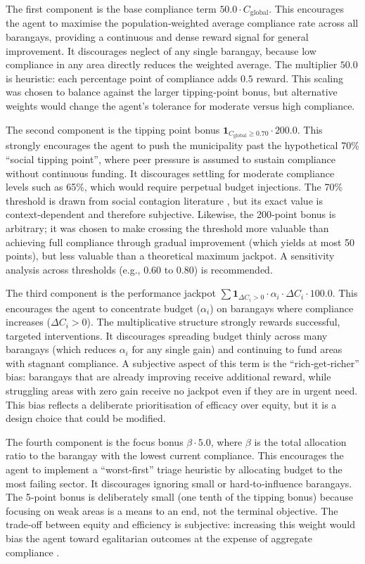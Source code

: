 The first component is the base compliance term \(50.0 \cdot C_{\text{global}}\). This encourages the agent to maximise the population‑weighted average compliance rate across all barangays, providing a continuous and dense reward signal for general improvement. It discourages neglect of any single barangay, because low compliance in any area directly reduces the weighted average. The multiplier \(50.0\) is heuristic: each percentage point of compliance adds \(0.5\) reward. This scaling was chosen to balance against the larger tipping‑point bonus, but alternative weights would change the agent’s tolerance for moderate versus high compliance.

The second component is the tipping point bonus \(\mathbf{1}_{C_{\text{global}} \ge 0.70} \cdot 200.0\). This strongly encourages the agent to push the municipality past the hypothetical 70\% “social tipping point”, where peer pressure is assumed to sustain compliance without continuous funding. It discourages settling for moderate compliance levels such as 65\%, which would require perpetual budget injections. The 70\% threshold is drawn from social contagion literature \citep{Centola2018}, but its exact value is context‑dependent and therefore subjective. Likewise, the 200‑point bonus is arbitrary; it was chosen to make crossing the threshold more valuable than achieving full compliance through gradual improvement (which yields at most 50 points), but less valuable than a theoretical maximum jackpot. A sensitivity analysis across thresholds (e.g., 0.60 to 0.80) is recommended.

The third component is the performance jackpot \(\sum \mathbf{1}_{\Delta C_i > 0} \cdot \alpha_i \cdot \Delta C_i \cdot 100.0\). This encourages the agent to concentrate budget (\(\alpha_i\)) on barangays where compliance increases (\(\Delta C_i > 0\)). The multiplicative structure strongly rewards successful, targeted interventions. It discourages spreading budget thinly across many barangays (which reduces \(\alpha_i\) for any single gain) and continuing to fund areas with stagnant compliance. A subjective aspect of this term is the “rich‑get‑richer” bias: barangays that are already improving receive additional reward, while struggling areas with zero gain receive no jackpot even if they are in urgent need. This bias reflects a deliberate prioritisation of efficacy over equity, but it is a design choice that could be modified.

The fourth component is the focus bonus \(\beta \cdot 5.0\), where \(\beta\) is the total allocation ratio to the barangay with the lowest current compliance. This encourages the agent to implement a “worst‑first” triage heuristic by allocating budget to the most failing sector. It discourages ignoring small or hard‑to‑influence barangays. The 5‑point bonus is deliberately small (one tenth of the tipping bonus) because focusing on weak areas is a means to an end, not the terminal objective. The trade‑off between equity and efficiency is subjective: increasing this weight would bias the agent toward egalitarian outcomes at the expense of aggregate compliance \citep{Alphonso2024}.

